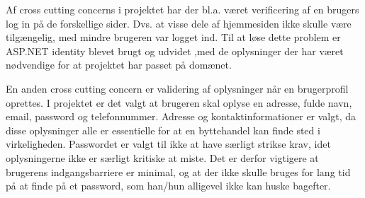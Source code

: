 Af cross cutting concerns i projektet har der bl.a. været verificering af en brugers log in på de forskellige sider. Dvs. at visse dele af hjemmesiden ikke skulle være tilgængelig, med mindre brugeren var logget ind. Til at løse dette problem er ASP.NET identity\cite{Identity} blevet brugt og udvidet ,med de oplysninger der har været nødvendige for at projektet har passet på domænet.

En anden cross cutting concern er validering af oplysninger når en brugerprofil oprettes. I projektet er det valgt at brugeren skal oplyse en adresse, fulde navn, email, password og telefonnummer. Adresse og kontaktinformationer er valgt, da disse oplysninger alle er essentielle for at en byttehandel kan finde sted i virkeligheden. Passwordet er valgt til ikke at have særligt strikse krav, idet oplysningerne ikke er særligt kritiske at miste. Det er derfor vigtigere at brugerens indgangsbarriere er minimal, og at der ikke skulle bruges for lang tid på at finde på et password, som han/hun alligevel ikke kan huske bagefter.